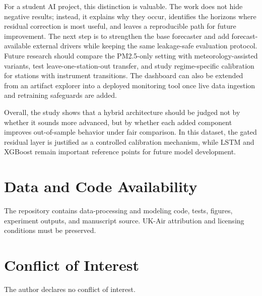 \documentclass[sn-mathphys-num]{sn-jnl}
\begin{document}
For a student AI project, this distinction is valuable. The work does not hide
negative results; instead, it explains why they occur, identifies the horizons
where residual correction is most useful, and leaves a reproducible path for
future improvement. The next step is to strengthen the base forecaster and add
forecast-available external drivers while keeping the same leakage-safe
evaluation protocol. Future research should compare the PM2.5-only setting
with meteorology-assisted variants, test leave-one-station-out transfer, and
study regime-specific calibration for stations with instrument transitions.
The dashboard can also be extended from an artifact explorer into a deployed
monitoring tool once live data ingestion and retraining safeguards are added.

Overall, the study shows that a hybrid architecture should be judged not by
whether it sounds more advanced, but by whether each added component improves
out-of-sample behavior under fair comparison. In this dataset, the gated
residual layer is justified as a controlled calibration mechanism, while LSTM
and XGBoost remain important reference points for future model development.

\section*{Data and Code Availability}
The repository contains data-processing and modeling code, tests, figures,
experiment outputs, and manuscript source. UK-Air attribution and licensing
conditions must be preserved.

\section*{Conflict of Interest}
The author declares no conflict of interest.

\clearpage
\begingroup
\small


\endgroup
\end{document}
